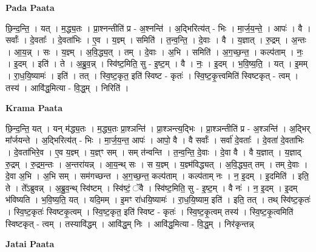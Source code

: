 \documentclass[17pt]{extarticle}
\begin{document}
\textbf{Pada Paata} \newline

छि॒न्द॒न्ति॒ । यत् । म॒द्ध्य॒तः । प्रा॒श्नन्तीति॑ प्र - अ॒श्नन्ति॑ । अ॒द्भिरित्य॑त् - भिः । मा॒र्ज॒य॒न्ते॒ । आपः॑ । वै । सर्वाः᳚ । दे॒वताः᳚ । दे॒वता॑भिः । ए॒व । य॒ज्ञ्म् । समिति॑ । त॒न्व॒न्ति॒ । दे॒वाः । वै । य॒ज्ञात् । रु॒द्रम् । अ॒न्तः । आ॒य॒न्न् । सः । य॒ज्ञ्म् । अ॒वि॒द्ध्य॒त् । तम् । दे॒वाः । अ॒भि । समिति॑ । अ॒ग॒च्छ॒न्त॒ । कल्प॑ताम् । नः॒ । इ॒दम् । इति॑ । ते । अ॒ब्रु॒व॒न्न् । स्वि॑ष्ट॒मिति॒ सु - इ॒ष्ट॒म् । वै । नः॒ । इ॒दम् । भ॒वि॒ष्य॒ति॒ । यत् । इ॒मम् । रा॒ध॒यि॒ष्यामः॑ । इति॑ । तत् । स्वि॒ष्ट॒कृत॒ इति॑ स्विष्ट - कृतः॑ । स्वि॒ष्ट॒कृ॒त्त्वमिति॑ स्विष्टकृत् - त्वम् । तस्य॑ । आवि॑द्ध॒मित्या - वि॒द्ध॒म् । निरिति॑ ।  \newline


\textbf{Krama Paata} \newline

छि॒न्द॒न्ति॒ यत् । यन् म॑द्ध्य॒तः । म॒द्ध्य॒तः प्रा॒श्ञन्ति॑ । प्रा॒श्ञन्त्य॒द्भिः । प्रा॒श्ञन्तीति॑ प्र - अ॒श्ञन्ति॑ । अ॒द्भिर् मा᳚र्जयन्ते । अ॒द्भिरित्य॑त् - भिः । मा॒र्ज॒य॒न्त॒ आपः॑ । आपो॒ वै । वै सर्वाः᳚ । सर्वा॑ दे॒वताः᳚ । दे॒वता॑ दे॒वता॑भिः । दे॒वता॑भिरे॒व । ए॒व य॒ज्ञ्म् । य॒ज्ञ्ꣳ सम् । सम् त॑न्वन्ति । त॒न्व॒न्ति॒ दे॒वाः । दे॒वा वै । वै य॒ज्ञात् । य॒ज्ञाद् रु॒द्रम् । रु॒द्रम॒न्तः । अ॒न्तरा॑यन्न् । आ॒य॒न्थ् सः । स य॒ज्ञ्म् । य॒ज्ञ्म॑विद्ध्यत् । अ॒वि॒द्ध्य॒त् तम् । तम् दे॒वाः । दे॒वा अ॒भि । अ॒भि सम् । सम॑गच्छन्त । अ॒ग॒च्छ॒न्त॒ कल्प॑ताम् । कल्प॑ताम् नः । न॒ इ॒दम् । इ॒दमिति॑ । इति॒ ते । ते᳚ऽब्रुवन्न् । अ॒ब्रु॒व॒न्थ् स्वि॑ष्टम् । स्वि॑ष्टं॒ ॅवै । स्वि॑ष्ट॒मिति॒ सु - इ॒ष्ट॒म् । वै नः॑ । न॒ इ॒दम् । इ॒दम् भ॑विष्यति । भ॒वि॒ष्य॒ति॒ यत् । यदि॒मम् । इ॒मꣳ रा॑धयि॒ष्यामः॑ । रा॒ध॒यि॒ष्याम॒ इति॑ । इति॒ तत् । तथ् स्वि॑ष्ट॒कृतः॑ । स्वि॒ष्ट॒कृतः॑ स्विष्टकृ॒त्वम् । स्वि॒ष्ट॒कृत॒ इति॑ स्विष्ट - कृतः॑ । स्वि॒ष्ट॒कृ॒त्वम् तस्य॑ । स्वि॒ष्ट॒कृ॒त्वमिति॑ स्विष्टकृत् - त्वम् । तस्यावि॑द्धम् । आवि॑द्ध॒म् निः । आवि॑द्ध॒मित्या - वि॒द्ध॒म् । निर॑कृन्तन्न् \newline

\textbf{Jatai Paata} \newline
\end{document}
